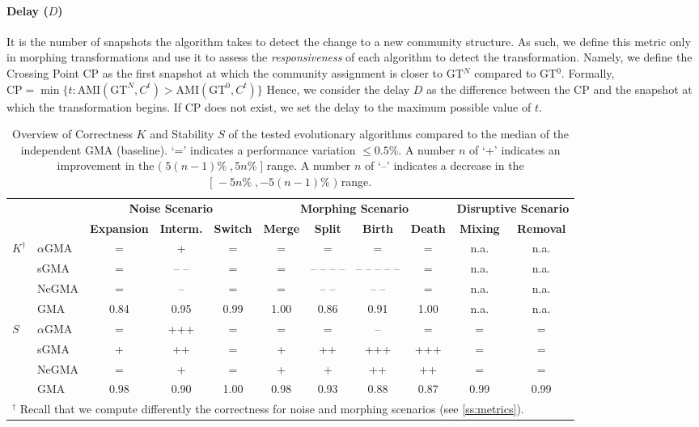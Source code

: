 \documentclass[letterpaper]{article}
\begin{document}
\paragraph*{Delay ($D$)} It is the number of snapshots the algorithm takes to detect the change to a new community structure. As such, we define this metric only in morphing transformations and use it to assess the \emph{responsiveness} of each algorithm to detect the transformation. Namely, we define the Crossing Point CP as the first snapshot at which the community assignment is closer to GT$^N$ compared to GT$^0$. Formally, $\text{CP}=\min\{t:\text{AMI}(\text{GT}^N,C^t)>\text{AMI}(\text{GT}^0,C^t)\}$ Hence, we consider the delay $D$ as the difference between the CP and the snapshot at which the transformation begins. If CP does not exist, we set the delay to the maximum possible value of $t$.

\begin{table}[]
\centering
\footnotesize
\caption{Overview of Correctness $K$ and Stability $S$ of the tested evolutionary algorithms compared to the median of the independent GMA (baseline). `=' indicates a performance
variation $\leq 0.5\%$. A number $n$ of `+' indicates an improvement in the $(\;5(n-1)\%\;,5n\%\;]$ range. A number $n$ of `--' indicates a decrease in the $[\;-5 n\%\;,-5(n-1)\%\;)$ range.}
\label{tab:main_results}
\begin{tabular}{ll|ccc|cccc|cc}
\toprule
& & \multicolumn{3}{c|}{\textbf{Noise Scenario}} & \multicolumn{4}{c|}{\textbf{Morphing Scenario}} & \multicolumn{2}{c}{\textbf{Disruptive Scenario}} \\
&\textbf{} & \textbf{Expansion} & \textbf{Interm.} & \textbf{Switch} & \textbf{Merge} & \textbf{Split} & \textbf{Birth} & \textbf{Death} & \textbf{Mixing} & \textbf{Removal} \\
\midrule
\multirow{4}{*}{$K ^\dagger$} &
$\alpha$GMA  & = & + & =   & = & =     & =     & =   & n.a. & n.a. \\
& sGMA       & = & -- -- & =    & = & -- -- -- -- & -- -- -- -- -- & =   & n.a. & n.a. \\
& NeGMA      & = & -- & =    & = & -- --     & -- --    & =   & n.a. & n.a. \\
\cmidrule{2-11}
& GMA      & 0.84 & 0.95 &  0.99 & 1.00 & 0.86 & 0.91 & 1.00  & n.a. & n.a. \\
\midrule
\multirow{4}{*}{$S$} &
$\alpha$GMA  & = & +++ & =  &= & =     & --   & =    & = & = \\
& sGMA       & + & ++ & =   &+ & ++    & +++ & +++  & = & = \\
& NeGMA      & = & + & =    &+ & +    & ++  & ++   & = & = \\
\cmidrule{2-11}
& GMA      & 0.98 & 0.90 &  1.00 & 0.98 & 0.93 &  0.88 & 0.87 & 0.99 & 0.99 \\
\bottomrule
\multicolumn{11}{l}{$^\dagger$ Recall that we compute differently the correctness for noise and morphing scenarios (see \cref{ss:metrics}).} \\
\end{tabular}
\end{table}
\end{document}
